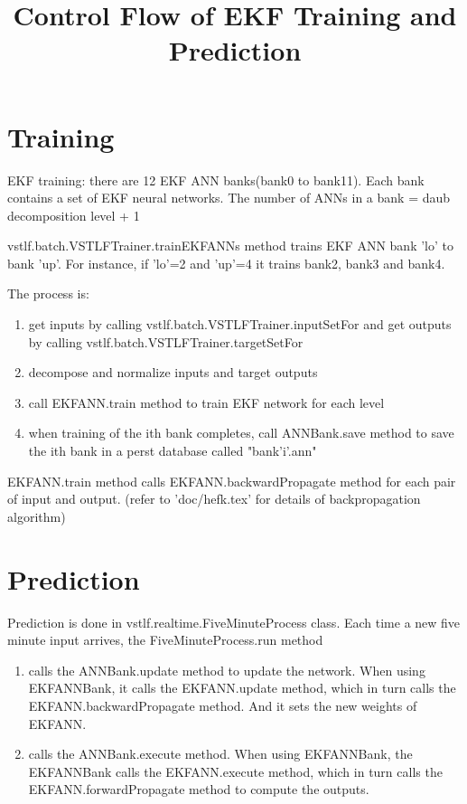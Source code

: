 \documentclass[letterpaper]{article}
\title{Control Flow of EKF Training and Prediction}
\begin{document}
\maketitle


\section{Training}
EKF training: there are 12 EKF ANN banks(bank0 to bank11). Each bank contains a set of EKF neural networks. The number of ANNs in a bank = daub decomposition level + 1
	

vstlf.batch.VSTLFTrainer.trainEKFANNs method trains EKF ANN bank 'lo' to bank 'up'. For instance, if 'lo'=2 and 'up'=4 it trains bank2, bank3 and bank4. 


The process is:
\begin{enumerate}
  \item get inputs by calling vstlf.batch.VSTLFTrainer.inputSetFor and get outputs by calling vstlf.batch.VSTLFTrainer.targetSetFor
  \item decompose and normalize inputs and target outputs
  \item call EKFANN.train method to train EKF network for each level
  \item when training of the ith bank completes, call ANNBank.save method to save the ith bank in a perst database called "bank'i'.ann"
\end{enumerate}


EKFANN.train method calls EKFANN.backwardPropagate method for each pair of input and output. (refer to 'doc/hefk.tex' for details of backpropagation algorithm)


\section{Prediction}

Prediction is done in vstlf.realtime.FiveMinuteProcess class. Each time a new five minute input arrives, the FiveMinuteProcess.run method

\begin{enumerate}
  \item calls the ANNBank.update method to update the network. When using EKFANNBank, it calls the EKFANN.update method, which in turn calls the EKFANN.backwardPropagate method. And it sets the new weights of EKFANN.
  \item calls the ANNBank.execute method. When using EKFANNBank, the EKFANNBank calls the  EKFANN.execute method, which in turn calls the EKFANN.forwardPropagate method to compute the outputs.
\end{enumerate}
\end{document}
